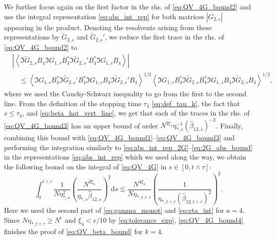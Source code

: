 \documentclass[10pt]{amsart}
\numberwithin{equation}{section}
\newcommand{\dif}{\mathrm{d}}
\begin{document}
We further focus again on the first factor in the rhs. of \eqref{eq:QV_4G_bound2} and use the integral representation \eqref{eq:abs_int_rep} for both matrices $|G_{2,s}|$ appearing in the product. Denoting the resolvents arising from these representations by $\widetilde{G}_{2,s}$ and $\widetilde{G}_{2,s}'$, we reduce the first trace in the rhs. of \eqref{eq:QV_4G_bound2} to
\begin{equation}
\begin{split}
&\left\vert\left\langle \Im\widetilde{G}_{2,s} B_4\Im G_{1,s}B_4^*\Im\widetilde{G}_{2,s}' B_4^*\Im G_{1,s}B_4\right\rangle\right\vert\\
&\quad \le \left\langle \Im G_{1,s}B_4^*\Im\widetilde{G}_{2,s}' B_4^*\Im G_{1,s} B_4 \Im\widetilde{G}_{2,s}'B_4\right\rangle^{1/2} \left\langle \Im G_{1,s}B_4^*\Im\widetilde{G}_{2,s} B_4^*\Im G_{1,s} B_4 \Im\widetilde{G}_{2,s}B_4\right\rangle^{1/2}, 
\end{split}
\label{eq:QV_4G_bound3}
\end{equation}
where we used the Cauchy-Schwarz inequality to go from the first to the second line. From the definition of the stopping time $\tau_4$ \eqref{eq:def_tau_k}, the fact that $s\le \tau_4$, and \eqref{eq:beta_hat_vert_line}, we get that each of the traces in the rhs. of \eqref{eq:QV_4G_bound3} has an upper bound of order $N^{2\xi_4}\eta_{*,s}^{-1}(\widehat{\beta}_{12,s})^{-2}$. Finally, combining this bound with \eqref{eq:QV_4G_bound1}--\eqref{eq:QV_4G_bound3} and performing the integration similarly to \eqref{eq:abs_int_rep_2G}--\eqref{eq:2G_abs_bound} in the representations \eqref{eq:abs_int_rep} which we used along the way, we obtain the following bound on the integral of \eqref{eq:QV_4G} in $s\in [0,t\wedge\tau]$:
\begin{equation}
\int_0^{t\wedge\tau}\frac{1}{N\eta_{*,s}^2}\left(\frac{N^{2\xi_4}}{\eta_{*,s}\widehat{\beta}_{12,s}}\right)^2\dif s\lesssim \frac{N^{4\xi_4}}{N\eta_{*,t\wedge\tau}}\left(\frac{1}{\eta_{*,t\wedge\tau}(\widehat{\beta}_{12,t\wedge\tau})^2}\right)^2.
\label{eq:QV_4G_bound4}
\end{equation}
Here we used the second part of \eqref{eq:gamma_monot} and \eqref{eq:eta_int} for $a=4$. Since $N\eta_{*,t\wedge\tau}\ge N^{\epsilon}$ and $\xi_4< \epsilon/10$ by \eqref{eq:tolerance_exp}, \eqref{eq:QV_4G_bound4} finishes the proof of \eqref{eq:QV_beta_bound} for $k=4$.
\end{document}
